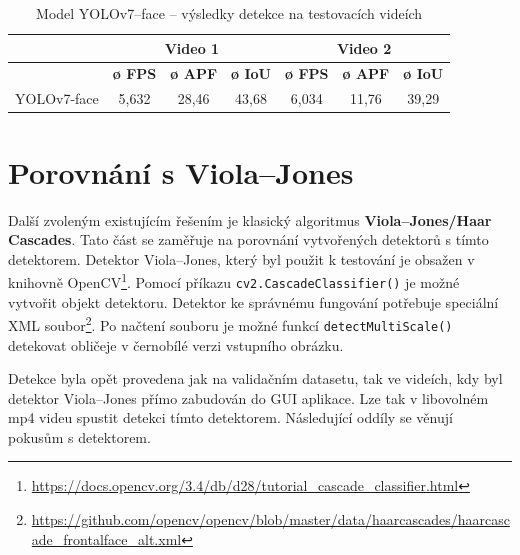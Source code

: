 \begin{table}[H]
  \centering
  \begin{tabular}{c|ccc|ccc|}
  \cline{2-7}
                                                               & \multicolumn{3}{c|}{\cellcolor[HTML]{CBCEFB}\textbf{Video 1}}                                                                              & \multicolumn{3}{c|}{\cellcolor[HTML]{CBCEFB}\textbf{Video 2}}                                                                              \\ \hline
  \rowcolor[HTML]{E0DBDB} 
  \multicolumn{1}{|c|}{\cellcolor[HTML]{E0DBDB}\textbf{Model}} & \multicolumn{1}{c|}{\cellcolor[HTML]{E0DBDB}\textbf{ø FPS}} & \multicolumn{1}{c|}{\cellcolor[HTML]{E0DBDB}\textbf{ø APF}} & \textbf{ø IoU} & \multicolumn{1}{c|}{\cellcolor[HTML]{E0DBDB}\textbf{ø FPS}} & \multicolumn{1}{c|}{\cellcolor[HTML]{E0DBDB}\textbf{ø APF}} & \textbf{ø IoU} \\ \hline
  \multicolumn{1}{|c|}{\cellcolor[HTML]{E0DBDB}YOLOv7-face}    & \multicolumn{1}{c|}{5,632}                                  & \multicolumn{1}{c|}{28,46}                                  & 43,68          & \multicolumn{1}{c|}{6,034}                                  & \multicolumn{1}{c|}{11,76}                                  & 39,29          \\ \hline
  \end{tabular}
  \label{tabulka:yolov7facevidea}
  \caption{Model YOLOv7--face -- výsledky detekce na testovacích videích}
\end{table}

\section{Porovnání s Viola--Jones}
\label{sekce:vj}
Další zvoleným existujícím řešením je klasický algoritmus \textbf{Viola--Jones/Haar Cascades}. Tato část se zaměřuje na porovnání vytvořených detektorů s tímto detektorem. Detektor Viola--Jones, který byl použit k testování je obsažen v knihovně OpenCV\footnote{\url{https://docs.opencv.org/3.4/db/d28/tutorial_cascade_classifier.html}}. Pomocí příkazu \texttt{cv2.CascadeClassifier()} je možné vytvořit objekt detektoru. Detektor ke správnému fungování potřebuje speciální XML soubor\footnote{\url{https://github.com/opencv/opencv/blob/master/data/haarcascades/haarcascade_frontalface_alt.xml}}. Po načtení souboru je možné funkcí \texttt{detectMultiScale()} detekovat obličeje v černobílé verzi vstupního obrázku.

Detekce byla opět provedena jak na validačním datasetu, tak ve videích, kdy byl detektor Viola--Jones přímo zabudován do GUI aplikace. Lze tak v libovolném mp4 videu spustit detekci tímto detektorem. Následující oddíly se věnují pokusům s detektorem.


